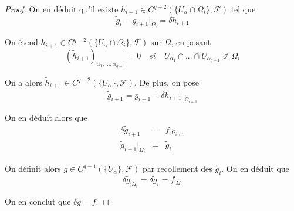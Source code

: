 \documentclass{article}
\theoremstyle{definition}
\theoremstyle{remarque}
\begin{document}
\begin{proof}
On en déduit qu'il existe $h_{i+1} \in C^{q-2}(\{U_\alpha\cap \Omega_i\}, \mathcal{F})$ tel que
$$\tilde{g}_i - g_{i+1}{|_{\Omega_{i}}} = \delta h_{i+1}$$

On étend $h_{i+1} \in C^{q-2}(\{U_\alpha\cap \Omega_i\}, \mathcal{F})$ sur $\Omega$, en posant
$$(\tilde{h}_{i+1})_{\alpha_1, ..., \alpha_{q-1}} = 0 \quad si \quad U_{\alpha_1}\cap ... \cap U_{\alpha_{q-1}} \not \subset \Omega_i$$

On a alors $\tilde{h}_{i+1} \in C^{q-2}(\{U_\alpha\}, \mathcal{F})$. De plus, on pose
$$\tilde{g}_{i+1} = g_{i+1} + \delta \tilde{h}_{i+1}|_{\Omega_{i+1}}$$

On en déduit alors que
\begin{eqnarray}
\nonumber \delta \tilde{g}_{i+1} &=& f_{|\Omega_{i+1}} \\
\nonumber \tilde{g}_{i+1}|_{\Omega_i} &=& \tilde{g}_i
\end{eqnarray}

On définit alors $\tilde{g} \in C^{q-1}(\{U_\alpha\}, \mathcal{F})$ par recollement des $\tilde{g}_i$. On en déduit que
$$\delta \tilde{g}_{|\Omega_i} = \delta \tilde{g}_i = f_{|\Omega_i}$$

On en conclut que $\delta \tilde{g} = f$.
\end{proof}
\end{document}
